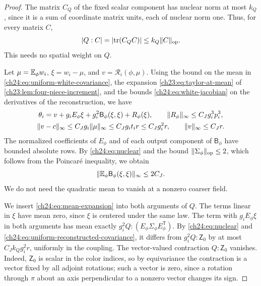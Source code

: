 \begin{proof}
The matrix $C_Q$ of the fixed scalar component has nuclear norm at most $k_Q$, since it is a sum of coordinate matrix units, each of nuclear norm one. Thus, for every matrix $C$,
\begin{equation}\label{ch24:eq:nuclear}
 \lvert Q:C\rvert=\lvert \operatorname{tr}(C_QC)\rvert\le k_Q\lVert C\rVert_{\mathrm{op}}.
\end{equation}
This needs no spatial weight on $Q$.

Let $\mu=\mathbb E_\phi w_i$, $\xi=w_i-\mu$, and $v=\mathscr R_i(\phi,\mu)$. Using the bound on the mean in \eqref{ch24:eq:uniform-white-covariance}, the expansion \eqref{ch23:eq:taylor-at-mean} of \cref{ch23:lem:four-piece-increment}, and the bounds \eqref{ch24:eq:white-jacobian} on the derivatives of the reconstruction, we have
\begin{equation}\label{ch24:eq:mean-expansion}
 \begin{gathered}
 \theta_i=v+g_iE_\phi\xi+g_i^2\mathsf B_\phi(\xi,\xi)+R_\phi(\xi),\qquad \lVert R_\phi\rVert_\infty\le C_Jg_i^3p_i^3,\\
 \lVert v-c\rVert_\infty\le C_Jg_i\lVert \mu\rVert_\infty\le C_Jg_it_ir\le C_Jg_i^2r,\qquad \lVert v\rVert_\infty\le C_Jr.
 \end{gathered}
\end{equation}
The normalized coefficients of $E_\phi$ and of each output component of $\mathsf B_\phi$ have bounded absolute rows. By \eqref{ch24:eq:nuclear} and the bound $\lVert \Sigma_\phi\rVert_{\mathrm{op}}\le2$, which follows from the Poincar\'e inequality, we obtain
\begin{equation}\label{ch24:eq:B-mean-bounded}
 \lVert \mathbb E_\phi\mathsf B_\phi(\xi,\xi)\rVert_\infty\le2C_J.
\end{equation}
We do not need the quadratic mean to vanish at a nonzero coarser field.

We insert \eqref{ch24:eq:mean-expansion} into both arguments of $Q$. The terms linear in $\xi$ have mean zero, since $\xi$ is centered under the same law. The term with $g_iE_\phi\xi$ in both arguments has mean exactly $g_i^2Q:(E_\phi\Sigma_\phi E_\phi^{\mathsf T})$. By \eqref{ch24:eq:nuclear} and \eqref{ch24:eq:uniform-reconstructed-covariance}, it differs from $g_i^2Q:\mathsf Z_0$ by at most $C_Jk_Qg_i^2r$, uniformly in the coupling. The vector-valued contraction $Q:\mathsf Z_0$ vanishes. Indeed, $\mathsf Z_0$ is scalar in the color indices, so by equivariance the contraction is a vector fixed by all adjoint rotations; such a vector is zero, since a rotation through $\pi$ about an axis perpendicular to a nonzero vector changes its sign.


\end{proof}
